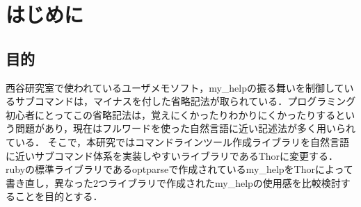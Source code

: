 \chapter{はじめに}\label{ux306fux3058ux3081ux306b}

\section{目的}\label{ux76eeux7684}

西谷研究室で使われているユーザメモソフト，my\_helpの振る舞いを制御しているサブコマンドは，マイナスを付した省略記法が取られている．プログラミング初心者にとってこの省略記法は，覚えにくかったりわかりにくかったりするという問題があり，現在はフルワードを使った自然言語に近い記述法が多く用いられている．
そこで，本研究ではコマンドラインツール作成ライブラリを自然言語に近いサブコマンド体系を実装しやすいライブラリであるThorに変更する．rubyの標準ライブラリであるoptparseで作成されているmy\_helpをThorによって書き直し，異なった2つライブラリで作成されたmy\_helpの使用感を比較検討することを目的とする．

    